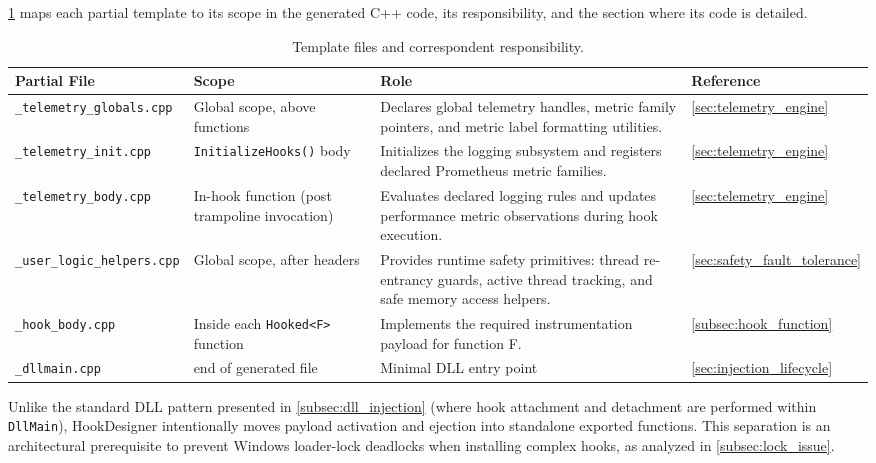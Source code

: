 \cref{tab:partial_matrix} maps each partial template to its scope in the generated C++ code, its responsibility, and the section where its code is detailed.

\begin{table}[H]
	\centering
	\small
	\begin{tabularx}{\textwidth}{@{} l >{\RaggedRight}p{3.5cm} >{\RaggedRight}X >{\RaggedRight}p{2.3cm} @{}}
		\toprule
		\textbf{Partial File} & \textbf{Scope} & \textbf{Role} & \textbf{Reference} \\
		\midrule
		\texttt{\_telemetry\_globals.cpp} & Global scope, above functions & Declares global telemetry handles, metric family pointers, and metric label formatting utilities. & \cref{sec:telemetry_engine} \\
		\addlinespace
		\texttt{\_telemetry\_init.cpp}    & \texttt{InitializeHooks()} body & Initializes the logging subsystem and registers declared Prometheus metric families. & \cref{sec:telemetry_engine} \\
		\addlinespace
		\texttt{\_telemetry\_body.cpp}    & In-hook function (post trampoline invocation) & Evaluates declared logging rules and updates performance metric observations during hook execution. & \cref{sec:telemetry_engine} \\
		\addlinespace
		\texttt{\_user\_logic\_helpers.cpp} & Global scope, after headers & Provides runtime safety primitives: thread re-entrancy guards, active thread tracking, and safe memory access helpers. & \cref{sec:safety_fault_tolerance} \\
		\addlinespace
		\texttt{\_hook\_body.cpp}         & Inside each \texttt{Hooked<F>} function & Implements the required instrumentation payload for function F. & \cref{subsec:hook_function} \\
		\addlinespace
		\texttt{\_dllmain.cpp}            & end of generated file & Minimal DLL entry point & \cref{sec:injection_lifecycle} \\
		\bottomrule
	\end{tabularx}
	\caption{Template files and correspondent responsibility.}
	\label{tab:partial_matrix}
	\end{table}

Unlike the standard \ac{DLL} pattern presented in \cref{subsec:dll_injection} (where hook attachment and detachment are performed within \texttt{DllMain}), HookDesigner intentionally moves payload activation and ejection into standalone exported functions.
This separation is an architectural prerequisite to prevent Windows loader-lock deadlocks when installing complex hooks, as analyzed in \cref{subsec:lock_issue}.

